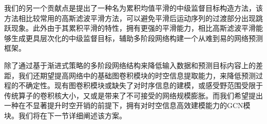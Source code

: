 我们的另一个贡献点是提出了一种名为累积均值平滑的中级监督目标构造方法，该方法相比较常用的高斯滤波平滑方法，可以避免平滑后运动序列的过渡部分出现跳跃现象。此外由于其累积平滑的特性，拥有更强的平滑能力，相比高斯滤波平滑能够生成更具层次化的中级监督目标，辅助多阶段网络构建一个从难到易的网络预测框架。

除了通过基于渐进式策略的多阶段网络结构来降低输入数据和预测目标内容上的差距，我们还期望提高网络中的基础图卷积模块的时空信息提取能力，来降低预测过程的不确定性。现有图卷积模块或缺失了对时序信息的建模，或感受野范围受限于传统算子的卷积核大小，又或是带来了不可接受的网络规模膨胀。而我们希望提出一种在不显著提升时空开销的前提下，拥有对时空信息高效建模能力的GCN模块。我们将在下一节详细阐述该方案。